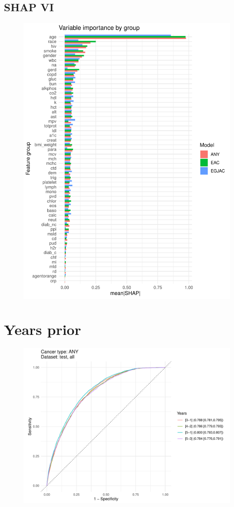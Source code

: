 \documentclass[english]{article}
\begin{document}
\newpage
\clearpage
\subsection{SHAP VI}


\begin{figure}[ht]
\includegraphics[width=0.8\linewidth]{variable_importance/shap_group.pdf}
\end{figure}





\newpage
\clearpage
\section{Years prior}



\begin{figure}[ht]
\includegraphics[width=1.0\linewidth]{cancerstage/2y_ANY_all.pdf}
\end{figure}
\end{document}
